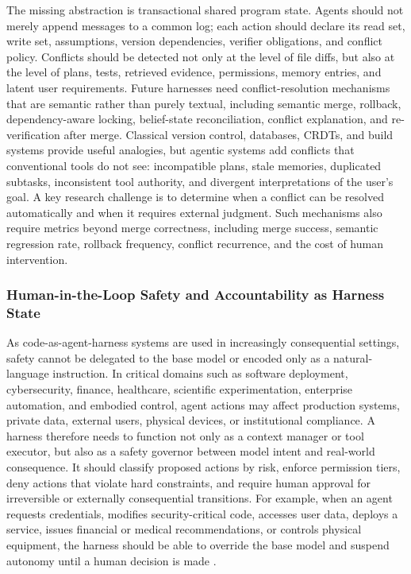 \documentclass{llmxive}
\begin{document}
The missing abstraction is transactional shared program state. Agents should not merely append messages to a common log; each action should declare its read set, write set, assumptions, version dependencies, verifier obligations, and conflict policy. Conflicts should be detected not only at the level of file diffs, but also at the level of plans, tests, retrieved evidence, permissions, memory entries, and latent user requirements. Future harnesses need conflict-resolution mechanisms that are semantic rather than purely textual, including semantic merge, rollback, dependency-aware locking, belief-state reconciliation, conflict explanation, and re-verification after merge. Classical version control, databases, CRDTs, and build systems provide useful analogies, but agentic systems add conflicts that conventional tools do not see: incompatible plans, stale memories, duplicated subtasks, inconsistent tool authority, and divergent interpretations of the user's goal. A key research challenge is to determine when a conflict can be resolved automatically and when it requires external judgment. Such mechanisms also require metrics beyond merge correctness, including merge success, semantic regression rate, rollback frequency, conflict recurrence, and the cost of human intervention.


\subsubsection{Human-in-the-Loop Safety and Accountability as Harness State}

As code-as-agent-harness systems are used in increasingly consequential settings, safety cannot be delegated to the base model or encoded only as a natural-language instruction. In critical domains such as software deployment, cybersecurity, finance, healthcare, scientific experimentation, enterprise automation, and embodied control, agent actions may affect production systems, private data, external users, physical devices, or institutional compliance. A harness therefore needs to function not only as a context manager or tool executor, but also as a safety governor between model intent and real-world consequence. It should classify proposed actions by risk, enforce permission tiers, deny actions that violate hard constraints, and require human approval for irreversible or externally consequential transitions. For example, when an agent requests credentials, modifies security-critical code, accesses user data, deploys a service, issues financial or medical recommendations, or controls physical equipment, the harness should be able to override the base model and suspend autonomy until a human decision is made \citep{Nunez2024AutoSafeCoder,vijayvargiya2025openagentsafety,guan2025normcode}.
\end{document}
